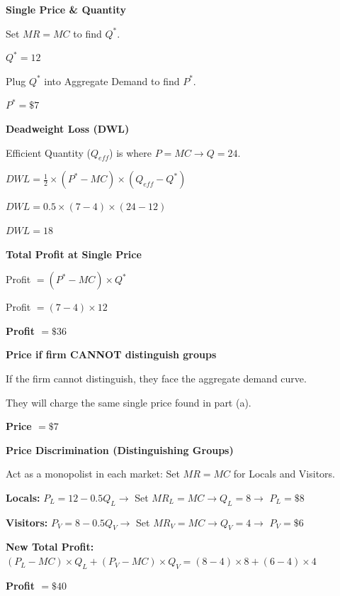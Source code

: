 \documentclass[12pt]{article}
\begin{document}
\begin{subqs}

\item \textbf{Single Price \& Quantity}
  \begin{solbullets}
    \item Set $MR = MC$ to find $Q^*$.
    \item \textbf{$Q^* = 12$}
    \item Plug $Q^*$ into Aggregate Demand to find $P^*$.
    \item \textbf{$P^* = \$7$}
  \end{solbullets}

\item \textbf{Deadweight Loss (DWL)}
  \begin{solbullets}
    \item Efficient Quantity ($Q_{eff}$) is where $P = MC \rightarrow Q = 24$.
    \item $DWL = \frac{1}{2} \times (P^* - MC) \times (Q_{eff} - Q^*)$
    \item $DWL = 0.5 \times (7 - 4) \times (24 - 12)$
    \item \textbf{$DWL = 18$}
  \end{solbullets}

\item \textbf{Total Profit at Single Price}
  \begin{solbullets}
    \item Profit $= (P^* - MC) \times Q^*$
    \item Profit $= (7 - 4) \times 12$
    \item \textbf{Profit $= \$36$}
  \end{solbullets}

\item \textbf{Price if firm CANNOT distinguish groups}
  \begin{solbullets}
    \item If the firm cannot distinguish, they face the aggregate demand curve.
    \item They will charge the same single price found in part (a).
    \item \textbf{Price $= \$7$}
  \end{solbullets}

\item \textbf{Price Discrimination (Distinguishing Groups)}
  \begin{solbullets}
    \item Act as a monopolist in each market: Set $MR = MC$ for Locals and Visitors.
    \item \textbf{Locals:} $P_L = 12 - 0.5Q_L \rightarrow$ Set $MR_L = MC \rightarrow Q_L = 8 \rightarrow$ \textbf{$P_L = \$8$}
    \item \textbf{Visitors:} $P_V = 8 - 0.5Q_V \rightarrow$ Set $MR_V = MC \rightarrow Q_V = 4 \rightarrow$ \textbf{$P_V = \$6$}
    \item \textbf{New Total Profit:} $(P_L - MC) \times Q_L + (P_V - MC) \times Q_V = (8 - 4) \times 8 + (6 - 4) \times 4$
    \item \textbf{Profit $= \$40$}
  \end{solbullets}


\end{subqs}
\end{document}
